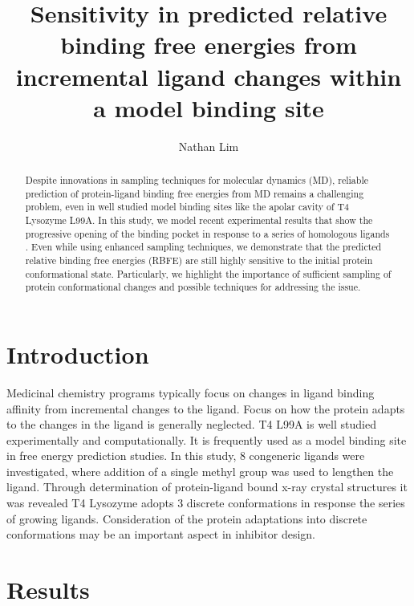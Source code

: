 \documentclass[journal=jctcce,manuscript=article]{achemso}
\author{Nathan Lim}
\affiliation[University of California, Irvine]
{Department of Pharmaceutical Sciences}
\title{Sensitivity in predicted relative binding free energies from incremental ligand changes within a model binding site}
\begin{document}
\begin{abstract}
Despite innovations in sampling techniques for molecular dynamics (MD), reliable prediction of protein-ligand binding free energies from MD remains a challenging problem, even in well studied model binding sites like the apolar cavity of T4 Lysozyme L99A\cite{Boyce2009}.
In this study, we model recent experimental results that show the progressive opening of the binding pocket in response to a series of homologous ligands \cite{Merski2015}.
Even while using enhanced sampling techniques, we demonstrate that the predicted relative binding free energies (RBFE) are still highly sensitive to the initial protein conformational state.
Particularly, we highlight the importance of sufficient sampling of protein conformational changes and possible techniques for addressing the issue.
\end{abstract}

\pagebreak


\section{Introduction}
Medicinal chemistry programs typically focus on changes in ligand binding affinity from incremental changes to the ligand.
Focus on how the protein adapts to the changes in the ligand is generally neglected.
T4 L99A is well studied experimentally and computationally.
It is frequently used as a model binding site in free energy prediction studies.
In this study, 8 congeneric ligands were investigated, where addition of a single methyl group was used to lengthen the ligand.
Through determination of protein-ligand bound x-ray crystal structures it was revealed T4 Lysozyme adopts 3 discrete conformations in response the series of growing ligands.
Consideration of the protein adaptations into discrete conformations may be an important aspect in inhibitor design.

\section{Results}
\end{document}
